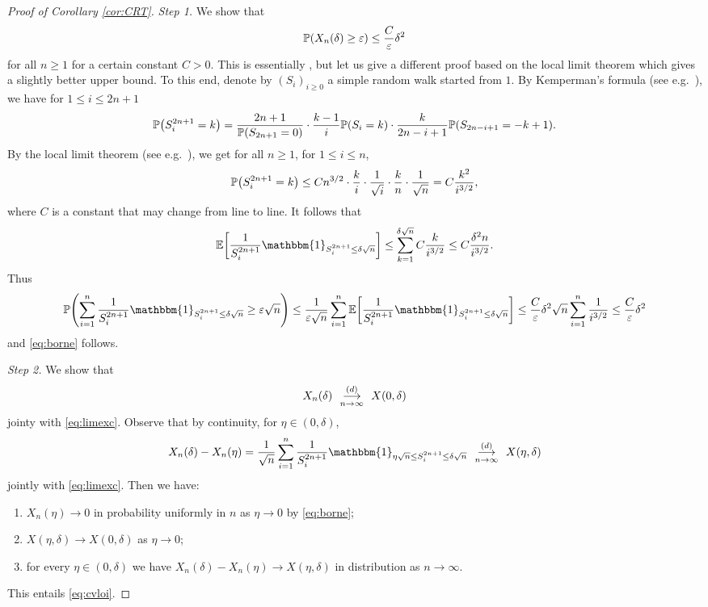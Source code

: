 \documentclass[11pt]{article}
\theoremstyle{plain}
\theoremstyle{definition}
\theoremstyle{remark}
\newcommand{\1}{\mathbbm{1}} %
\newcommand{\esp}[1]{\mathbb{E}\left[#1\right]} %
\newcommand{\proba}[1]{\mathbb{P}\left(#1\right)} %
\newcommand{\e}{\varepsilon} %
\newcommand{\cvloi}[1][n]{\enskip\mathop{\longrightarrow}^{(d)}_{#1 \to \infty}\enskip}
\let\originalleft\left
\let\originalright\right
\renewcommand{\left}{\mathopen{}\mathclose\bgroup\originalleft}
\renewcommand{\right}{\aftergroup\egroup\originalright}
\begin{document}
\begin{proof}[Proof of Corollary \ref{cor:CRT}]
\emph{Step 1.} We show that
\begin{equation}
\label{eq:borne} \proba{X_{n}(\delta) \geq \e} \leq  \frac{C}{\e} \delta^{2}
\end{equation}
for all $n\ge 1$ {for a certain constant $C>0$.}
This is essentially \cite[Lemma 3.6]{CMY00}, but let us give a  different proof based on the local limit theorem which gives a slightly better upper bound.
To this end, denote by $(S_{i})_{i \geq 0}$ a simple random walk started from ${1}$.  By Kemperman's formula (see e.g.~\cite[Sec.~6.1]{Pit06}), we have {for $1 \leq i \leq 2n+1$}
\begin{equation}
\label{eq:probalocale}
\proba{S^{2n+1}_{i}=k}= \frac{2n+1}{\proba{S_{2n+1}=0}} \cdot \frac{k-1}{i} \proba{S_{i}=k} \cdot  \frac{k}{2n-i+1} \proba{S_{2n-i+1}=-k+1}.
\end{equation}
By the local limit theorem (see e.g.~\cite[Theorem 4.2.1]{IL71}), we get for all $n \ge 1$, for $1 \leq i \leq n$,
\[
\proba{S^{2n+1}_{i}=k} \leq C n^{3/2} \cdot  \frac{k}{i} \cdot \frac{1}{\sqrt{i}} \cdot  \frac{k}{n} \cdot \frac{1}{\sqrt{n}}= C  \frac{k^{2}}{i^{3/2}},
\]
where $C$ is a constant that may change from line to line. It follows that 
\[\esp{ \frac{1}{S^{2n+1}_{i}} \mathbbm{1}_{S^{2n+1}_{i}\leq \delta \sqrt{n}} } \leq \sum_{k=1}^{\delta \sqrt{n}} C \frac{k}{i ^{3/2}} \leq C \frac{\delta^{2} n}{i ^{3/2}}.
\]
Thus
\[
\proba{ \sum_{i=1}^n  \frac{1}{S^{2n+1}_{i}} \mathbbm{1}_{S^{2n+1}_{i}\leq \delta \sqrt{n}} \geq \e \sqrt{n}} \leq \frac{1}{\e \sqrt{n}} \sum_{i=1}^{n} \esp{ \frac{1}{S^{2n+1}_{i}} \mathbbm{1}_{S^{2n+1}_{i}\leq \delta \sqrt{n}} } \leq  \frac{C}{\e} {\delta^{2}}{\sqrt{n}} \sum_{i=1}^{n} \frac{1}{i ^{3/2}}  \leq  \frac{C}{\varepsilon} \delta^{2}
\]
and \eqref{eq:borne} follows.


\emph{Step 2.} We show that
\begin{equation}
\label{eq:cvloi} X_{n}(\delta) \cvloi X(0,\delta)
\end{equation}
jointy with \eqref{eq:limexc}. Observe that by continuity, for $\eta \in (0,\delta)$,
\[
X_{n}(\delta)-X_{n}(\eta)= \frac{1}{\sqrt{n}} \sum_{i=1}^n  \frac{1}{S^{2n+1}_{i}} \mathbbm{1}_{ \eta \sqrt{n} \leq S^{2n+1}_{i}\leq \delta \sqrt{n}} \cvloi  X(\eta,\delta)
\]
jointly with \eqref{eq:limexc}. Then we have:
 \begin{enumerate}
\item[--] $X_{n}(\eta) \rightarrow 0$ in probability uniformly in $n$ as $\eta \rightarrow 0$ by \eqref{eq:borne};
\item[--] $X(\eta,\delta) \rightarrow X(0,\delta)$ as $\eta \rightarrow 0$;
\item[--] for every $\eta \in (0,\delta) $ we have $X_{n}(\delta)-X_{n}(\eta) \rightarrow X(\eta,\delta)$ in distribution as $n \rightarrow \infty$. 
\end{enumerate}
This entails \eqref{eq:cvloi}. 




\end{proof}
\end{document}
